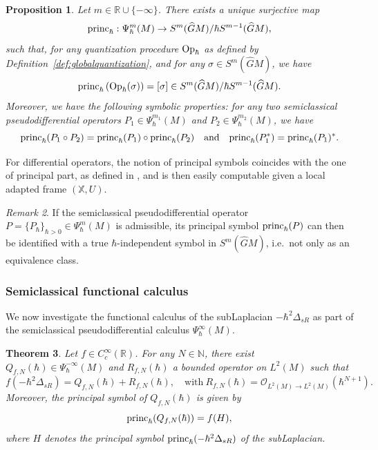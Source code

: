 \documentclass[12pt,a4paper]{amsart}
\theoremstyle{plain}
\newtheorem{theorem}{Theorem}[section]
\newtheorem{proposition}[theorem]{Proposition}
\theoremstyle{definition}
\theoremstyle{remark}
\newtheorem{remark}[theorem]{Remark}
\numberwithin{equation}{section}
\theoremstyle{definition}
\def\R{{\mathbb R}}%
\def\N{{\mathbb N}}%
\def \Op{{\rm Op}}
\def \O{\mathscr{O}}
\def \bX{\mathbb{X}}
\def \Ghat{\widehat{G}}
\def \princ{{\rm princ}_{\hbar}}
\numberwithin{equation}{section}
\begin{document}
\begin{proposition}
    \label{prop:principalsym}
    Let $m\in\R\cup\{-\infty\}$. There exists a unique surjective map
    \begin{equation*}
        \princ:\Psi_\hbar^m(M)\rightarrow S^m(\Ghat M)/\hbar S^{m-1}(\Ghat M),
    \end{equation*}
    such that, for any quantization procedure $\Op_\hbar$ as defined by Definition~\ref{def:globalquantization}, and for any $\sigma\in S^m(\Ghat M)$, we have
    \begin{equation*}
        \princ\left(\Op_\hbar(\sigma)\right) = [\sigma] \in S^m(\Ghat M)/\hbar S^{m-1}(\Ghat M).
    \end{equation*}
    Moreover, we have the following symbolic properties: for any two semiclassical pseudodifferential operators $P_1 \in \Psi_\hbar^{m_1}(M)$ and $P_2 \in \Psi_\hbar^{m_2}(M)$, we have
    \begin{equation*}
        \princ(P_1\circ P_2) = \princ(P_1)\circ \princ(P_2)\quad\mbox{and}\quad\princ(P_1^*) = \princ(P_1)^*.
    \end{equation*}
\end{proposition}

For differential operators, the notion of principal symbols coincides with the one of principal part, as defined in \cite[Section 3.4]{FFF24}, and is then easily computable given a local adapted frame $(\bX,U)$.

\begin{remark}
    If the semiclassical pseudodifferential operator $P = \{P_\hbar\}_{\hbar>0} \in \Psi_\hbar^m(M)$ is admissible, its principal symbol $\princ (P)$ can then be identified with a true $\hbar$-independent symbol in $S^m(\Ghat M)$, i.e.~not only as an equivalence class.
\end{remark}

\subsubsection{Semiclassical functional calculus}

We now investigate the functional calculus of the subLaplacian $-\hbar^2 \Delta_{sR}$ as part of the semiclassical pseudodifferential calculus $\Psi_\hbar^\infty(M)$. 

\begin{theorem}
    \label{thm:functionalcalc}
    Let $f\in C_c^\infty(\R)$. For any $N\in \N$, there exist $Q_{f,N}(\hbar)\in \Psi_\hbar^{-\infty}(M)$ and $R_{f,N}(\hbar)$ a bounded operator on $L^2(M)$ such that
    \begin{equation*}
        f(-\hbar^2\Delta_{sR}) = Q_{f,N}(\hbar) + R_{f,N}(\hbar),\quad\mbox{with}\ R_{f,N}(\hbar) = \O_{L^2(M)\rightarrow L^2(M)}(\hbar^{N+1}).
    \end{equation*}
    Moreover, the principal symbol of $Q_{f,N}(\hbar)$ is given by
    \begin{equation*}
        \princ(Q_{f,N}(\hbar)) = f(H),
    \end{equation*}
    where $H$ denotes the principal symbol $\princ(-\hbar^2\Delta_{sR})$ of the subLaplacian.
\end{theorem}
\end{document}
